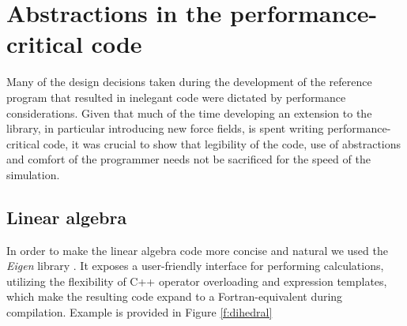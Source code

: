 \section{Abstractions in the performance-critical code}\label{new:abs}
Many of the design decisions taken during the development of the reference program that resulted in inelegant code were dictated by performance considerations. Given that much of the time developing an extension to the library, in particular introducing new force fields, is spent writing performance-critical code, it was crucial to show that legibility of the code, use of abstractions and comfort of the programmer needs not be sacrificed for the speed of the simulation.

\subsection{Linear algebra}
In order to make the linear algebra code more concise and natural we used the \emph{Eigen} library \cite{eigen}. It exposes a user-friendly interface for performing calculations, utilizing the flexibility of C++ operator overloading and expression templates, which make the resulting code expand to a Fortran-equivalent during compilation. Example is provided in Figure \ref{f:dihedral}

